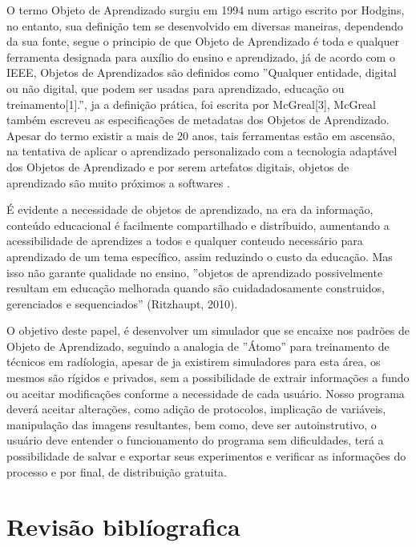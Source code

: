 \documentclass[12pt,openright,oneside,a4paper,english,french,spanish,brazil]{unifil}
\begin{document}
O termo Objeto de Aprendizado surgiu em 1994  num artigo escrito por Hodgins, no entanto, sua definição tem se desenvolvido em diversas maneiras, dependendo da sua fonte, segue o principio de que Objeto de Aprendizado é toda e qualquer ferramenta designada para auxílio do ensino e aprendizado, já de acordo com o IEEE, Objetos de Aprendizados são definidos como ''Qualquer entidade, digital ou não digital, que podem ser usadas para aprendizado, educação ou treinamento[1].'', ja a definição prática, foi escrita por McGreal[3], McGreal também escreveu as especificações de metadatas dos Objetos de Aprendizado. Apesar do termo existir a mais de 20 anos, tais ferramentas estão em ascensão, na tentativa de aplicar o aprendizado personalizado com a tecnologia adaptável dos Objetos de Aprendizado e por serem artefatos digitais, objetos de aprendizado são muito próximos a softwares \cite{Braga:2012}.
	
	É evidente a necessidade de objetos de aprendizado, na era da informação, conteúdo educacional é facilmente compartilhado e distríbuido, aumentando a acessibilidade de aprendizes a todos e qualquer conteudo necessário para aprendizado de um tema específico, assim reduzindo o custo da educação. Mas isso não garante qualidade no ensino, ''objetos de aprendizado possivelmente resultam em educação melhorada quando são cuidadadosamente construidos, gerenciados e sequenciados'' (Ritzhaupt, 2010).
	
	O objetivo deste papel, é desenvolver um simulador que se encaixe nos padrões de Objeto de Aprendizado, seguindo a analogia de ''Átomo'' para treinamento de técnicos em radíologia, apesar de ja existirem simuladores para esta área, os mesmos são rígidos e privados, sem a possibilidade de extrair informações a fundo ou aceitar modificações conforme a necessidade de cada usuário. Nosso programa deverá aceitar alterações, como adição de protocolos, implicação de variáveis, manipulação das imagens resultantes, bem como, deve ser autoinstrutivo, o usuário deve entender o funcionamento do programa sem dificuldades, terá a possibilidade de salvar e exportar seus experimentos e verificar as informações do processo e por final, de distribuição gratuita.

\chapter{Revisão biblíografica}%
\end{document}
